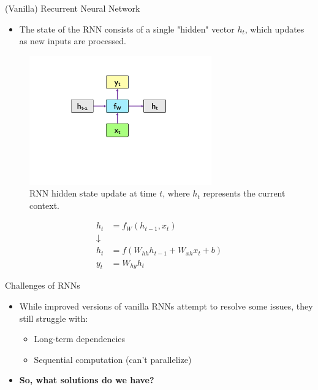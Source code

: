\documentclass[serif, aspectratio=169]{beamer}
\begin{document}
\begin{frame}{(Vanilla) Recurrent Neural Network}
	\begin{itemize}
		\item The state of the RNN consists of a single "hidden" vector \( h_t \), which updates as new inputs are processed.
	\end{itemize}
	\vspace{-35pt}
	\begin{figure}
		\includegraphics[width=0.7\textwidth]{pic/RNN-final.png}
		\caption{RNN hidden state update at time \( t \), where \( h_t \) represents the current context.}
	\end{figure}
	\vspace{-100pt}
	\begin{align*}
		h_t &= f_W(h_{t-1}, x_t) \\ 
		\downarrow \\
		h_t &= f(W_{hh} h_{t-1} + W_{xh} x_t + b) \\ 
		y_t &= W_{hy} h_t
	\end{align*}
\end{frame}

\begin{frame}{Challenges of RNNs}
	\begin{itemize}
		\item While improved versions of vanilla RNNs attempt to resolve some issues, they still struggle with:
		\begin{itemize}
			\item Long-term dependencies
			\item Sequential computation (can't parallelize)
		\end{itemize}
		\item \textbf{So, what solutions do we have?}
	\end{itemize}
\end{frame}
\end{document}

